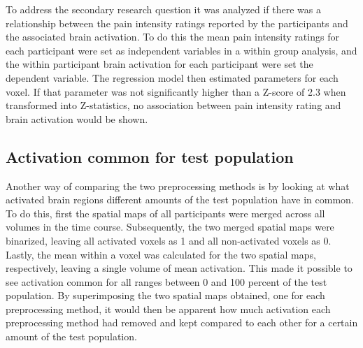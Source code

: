 To address the secondary research question it was analyzed if there was a relationship between the pain intensity ratings reported by the participants and the associated brain activation. To do this the mean pain intensity ratings for each participant were set as independent variables in a within group analysis, and the within participant brain activation for each participant were set the dependent variable. The regression model then estimated parameters for each voxel. If that parameter was not significantly higher than a Z-score of 2.3 when transformed into Z-statistics, no association between pain intensity rating and brain activation would be shown. 

\subsection{Activation common for test population}
Another way of comparing the two preprocessing methods is by looking at what activated brain regions different amounts of the test population have in common. To do this, first the spatial maps of all participants were merged across all volumes in the time course. Subsequently, the two merged spatial maps were binarized, leaving all activated voxels as 1 and all non-activated voxels as 0. Lastly, the mean within a voxel was calculated for the two spatial maps, respectively, leaving a single volume of mean activation. This made it possible to see activation common for all ranges between 0 and 100 percent of the test population. By superimposing the two spatial maps obtained, one for each preprocessing method, it would then be apparent how much activation each preprocessing method had removed and kept compared to each other for a certain amount of the test population. \cite{Coghill2003}
